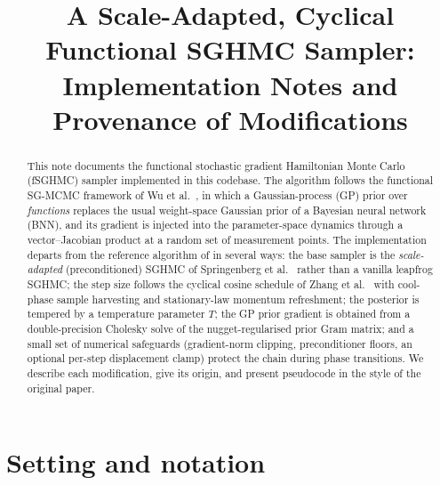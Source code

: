 \documentclass[11pt]{article}
\title{A Scale-Adapted, Cyclical Functional SGHMC Sampler:\\
Implementation Notes and Provenance of Modifications}
\author{}
\date{}
\begin{document}
\maketitle

\begin{abstract}
This note documents the functional stochastic gradient Hamiltonian Monte Carlo
(fSGHMC) sampler implemented in this codebase.  The algorithm follows the
functional SG-MCMC framework of Wu et al.~\cite{wu2025},
in which a Gaussian-process (GP) prior over \emph{functions} replaces the usual
weight-space Gaussian prior of a Bayesian neural network (BNN), and its
gradient is injected into the parameter-space dynamics through a
vector--Jacobian product at a random set of measurement points.  The
implementation departs from the reference algorithm of \cite{wu2025} in several
ways: the base sampler is the \emph{scale-adapted} (preconditioned) SGHMC of
Springenberg et al.~\cite{springenberg2016} rather than a vanilla
leapfrog SGHMC; the step size follows the cyclical cosine schedule of Zhang et
al.~\cite{zhang2020} with cool-phase sample harvesting and stationary-law
momentum refreshment; the posterior is tempered by a temperature parameter
$T$; the GP prior gradient is obtained from a double-precision Cholesky solve
of the nugget-regularised prior Gram matrix; and a small set of numerical
safeguards
(gradient-norm clipping, preconditioner floors, an optional per-step
displacement clamp) protect the chain during phase transitions.  We describe
each modification, give its origin, and present pseudocode in the style of the
original paper.
\end{abstract}

\section{Setting and notation}
\end{document}
